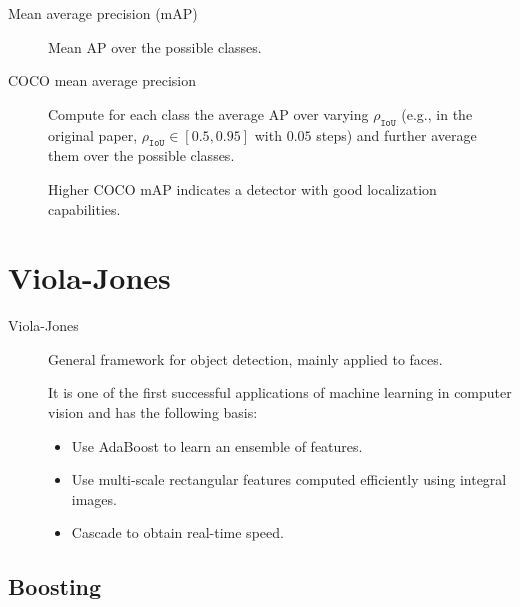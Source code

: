 \begin{description}
\begin{description}
            \item[Mean average precision (mAP)] 
                Mean AP over the possible classes.

            \item[COCO mean average precision] 
                Compute for each class the average AP over varying $\rho_\texttt{IoU}$ (e.g., in the original paper, $\rho_\texttt{IoU} \in [0.5, 0.95]$ with $0.05$ steps) and further average them over the possible classes.

                \begin{remark}
                    Higher COCO mAP indicates a detector with good localization capabilities.
                \end{remark}
        \end{description}
\end{description}



\section{Viola-Jones}

\begin{description}
    \item[Viola-Jones] 
        General framework for object detection, mainly applied to faces.

        It is one of the first successful applications of machine learning in computer vision and has the following basis:
        \begin{itemize}
            \item Use AdaBoost to learn an ensemble of features.
            \item Use multi-scale rectangular features computed efficiently using integral images.
            \item Cascade to obtain real-time speed.
        \end{itemize}
\end{description}


\subsection{Boosting}

